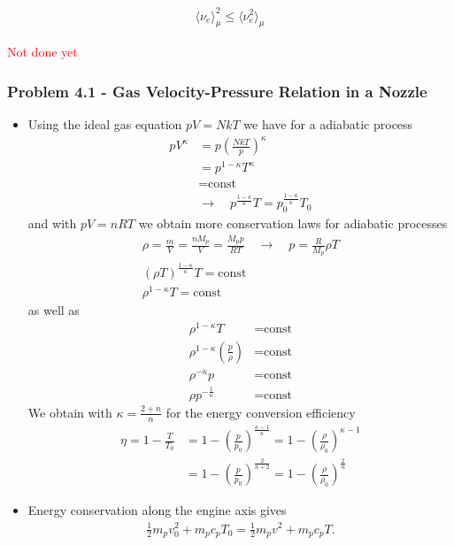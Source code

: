 \documentclass[10pt,a4paper]{article}
\theoremstyle{definition}
\begin{document}
\begin{align}
    \langle \nu_e\rangle_\mu^2\le\langle \nu_e^2\rangle_\mu    
\end{align}

\textcolor{red}{Not done yet}

\subsubsection{Problem 4.1 - Gas Velocity-Pressure Relation in a Nozzle}
\begin{itemize}
\item Using the ideal gas equation $pV=NkT$ we have for a adiabatic process
\begin{align}
    pV^\kappa&=p\left(\frac{NkT}{p}\right)^\kappa\\
    &=p^{1-\kappa}T^\kappa\\
    &=\text{const}\\
    &\rightarrow\quad p^\frac{1-\kappa}{\kappa}T=p_0^\frac{1-\kappa}{\kappa}T_0
\end{align}
and with $pV=nRT$ we obtain more conservation laws for adiabatic processes
\begin{align}
    \rho=\frac{m}{V}=\frac{nM_p}{V}=\frac{M_pp}{RT}\quad\rightarrow\quad p=\frac{R}{M_p}\rho T\\
    (\rho T)^\frac{1-\kappa}{\kappa}T=\text{const}\\
    \rho^{1-\kappa}T=\text{const}
\end{align}
as well as
\begin{align}
    \rho^{1-\kappa}T&=\text{const}\\
    \rho^{1-\kappa}\left(\frac{p}{\rho}\right)&=\text{const}\\
    \rho^{-\kappa}p&=\text{const}\\
    \rho p^{-\frac{1}{\kappa}}&=\text{const}
\end{align}
We obtain with $\kappa=\frac{2+n}{n}$ for the energy conversion efficiency 
\begin{align}
    \eta=1-\frac{T}{T_0}&=1-\left(\frac{p}{p_0}\right)^\frac{\kappa-1}{\kappa}=1-\left(\frac{\rho}{\rho_0}\right)^{\kappa-1}\\
    &=1-\left(\frac{p}{p_0}\right)^\frac{2}{n+2}=1-\left(\frac{\rho}{\rho_0}\right)^\frac{2}{n}
\end{align}
\item Energy conservation along the engine axis gives
\begin{align}
    \frac{1}{2}m_pv_0^2+m_pc_pT_0=\frac{1}{2}m_pv^2+m_pc_pT.

\end{align}
\end{itemize}
\end{document}
